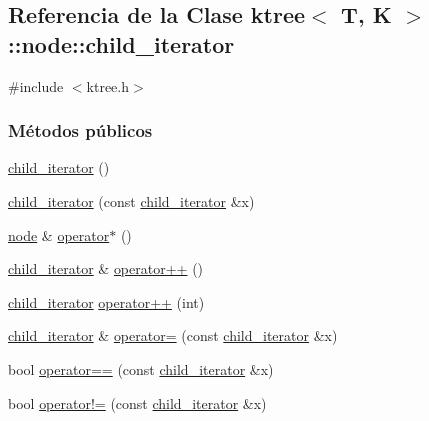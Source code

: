 \hypertarget{classktree_1_1node_1_1child__iterator}{}\subsection{Referencia de la Clase ktree$<$ T, K $>$\+:\+:node\+:\+:child\+\_\+iterator}
\label{classktree_1_1node_1_1child__iterator}


{\ttfamily \#include $<$ktree.\+h$>$}

\subsubsection*{Métodos públicos}
\begin{DoxyCompactItemize}
\item 
\hyperlink{classktree_1_1node_1_1child__iterator_aa2a88529bdbc2d1ca8d0660e5e592f6b}{child\+\_\+iterator} ()
\item 
\hyperlink{classktree_1_1node_1_1child__iterator_a7fd38409a0b9f8096903ec320a297c88}{child\+\_\+iterator} (const \hyperlink{classktree_1_1node_1_1child__iterator}{child\+\_\+iterator} \&x)
\item 
\hyperlink{classktree_1_1node}{node} \& \hyperlink{classktree_1_1node_1_1child__iterator_a1086c36826bb38f4918c9b4e813f571f}{operator$\ast$} ()
\item 
\hyperlink{classktree_1_1node_1_1child__iterator}{child\+\_\+iterator} \& \hyperlink{classktree_1_1node_1_1child__iterator_ae7c1d3c7f27cc407fcf081b752d4fc0d}{operator++} ()
\item 
\hyperlink{classktree_1_1node_1_1child__iterator}{child\+\_\+iterator} \hyperlink{classktree_1_1node_1_1child__iterator_a69b171c7e0f1b17c3582fd7021efe944}{operator++} (int)
\item 
\hyperlink{classktree_1_1node_1_1child__iterator}{child\+\_\+iterator} \& \hyperlink{classktree_1_1node_1_1child__iterator_a00140b3fc82a29b9b2e5fc93fa586d55}{operator=} (const \hyperlink{classktree_1_1node_1_1child__iterator}{child\+\_\+iterator} \&x)
\item 
bool \hyperlink{classktree_1_1node_1_1child__iterator_a22cf8c7aa9de6694626c6a12e285b9df}{operator==} (const \hyperlink{classktree_1_1node_1_1child__iterator}{child\+\_\+iterator} \&x)
\item 
bool \hyperlink{classktree_1_1node_1_1child__iterator_a8b2d218a03cf3f6df5387ee3c7511ff7}{operator!=} (const \hyperlink{classktree_1_1node_1_1child__iterator}{child\+\_\+iterator} \&x)
\end{DoxyCompactItemize}
